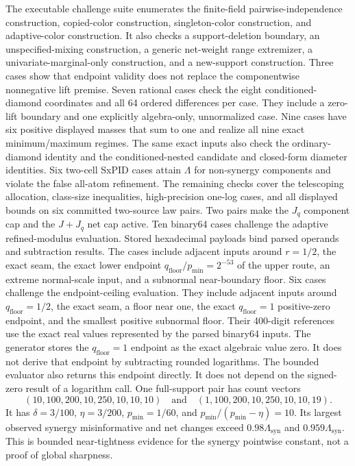 \documentclass[11pt]{article}
\theoremstyle{definition}
\begin{document}
The executable challenge suite enumerates the finite-field pairwise-independence construction,
copied-color construction, singleton-color construction, and adaptive-color construction.  It also
checks a support-deletion boundary, an unspecified-mixing construction, a generic net-weight range
extremizer, a univariate-marginal-only construction, and a new-support construction.  Three cases
show that endpoint validity does not replace the componentwise nonnegative lift premise.  Seven
rational cases check the eight conditioned-diamond coordinates and all 64 ordered differences per
case.  They include a zero-lift boundary and one explicitly algebra-only, unnormalized case.  Nine
cases have six positive displayed masses that sum to one and realize all nine exact
minimum/maximum regimes.  The same exact inputs also check the ordinary-diamond identity and the
conditioned-nested candidate and closed-form diameter identities.  Six
two-cell SxPID cases attain $\Lambda$ for non-synergy components and violate the false all-atom
refinement.  The
remaining checks cover the telescoping allocation, class-size inequalities, high-precision
one-log cases, and all displayed bounds on six committed two-source law pairs.  Two pairs make the
$J_q$ component cap and the $J+J_q$ net cap active.  Ten binary64 cases challenge the adaptive
refined-modulus evaluation.  Stored hexadecimal payloads bind parsed operands and subtraction
results.  The cases include adjacent inputs around $r=1/2$, the exact seam, the exact lower
endpoint $q_{\mathrm{floor}}/p_{\min}=2^{-53}$ of the upper route, an extreme normal-scale input,
and a subnormal near-boundary floor.  Six cases challenge the
endpoint-ceiling evaluation.  They include adjacent inputs around
$q_{\mathrm{floor}}=1/2$, the exact seam, a floor near one, the exact
$q_{\mathrm{floor}}=1$ positive-zero endpoint, and the smallest positive subnormal floor.  Their
400-digit references use the exact real values represented by the parsed binary64 inputs.
The generator stores the $q_{\mathrm{floor}}=1$ endpoint as the exact algebraic value zero.  It
does not derive that endpoint by subtracting rounded logarithms.  The bounded evaluator also
returns this endpoint directly.  It does not depend on the signed-zero result of a logarithm
call.  One
full-support pair has count
vectors
\begin{equation}
  (10,100,200,10,250,10,10,10)
  \quad\text{and}\quad
  (1,100,200,10,250,10,10,19).
\end{equation}
It has $\delta=3/100$, $\eta=3/200$, $p_{\min}=1/60$, and
$p_{\min}/(p_{\min}-\eta)=10$.  Its largest observed synergy misinformative and net changes exceed
$0.98\Lambda_{\mathrm{syn}}$ and $0.959\Lambda_{\mathrm{syn}}$.  This is bounded near-tightness
evidence for the synergy pointwise constant, not a proof of global sharpness.
\end{document}
